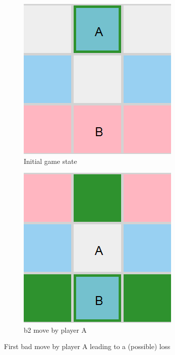 \begin{figure}[!ht]
    \begin{subfigure}{0.3\textwidth}
      \includegraphics[width=\textwidth]{../img/GameBoard/3_3_board_start.png}
      \caption{Initial game state}
      \label{fig:3x3InitialGameState}
    \end{subfigure}
    \hfill
    \begin{subfigure}{0.3\textwidth}
      \includegraphics[width=\textwidth]{../img/GameBoard/3_3_mcts_move.png}
      \caption{b2 move by player A}
        \label{fig:3x3b2movebyA}
    \end{subfigure}
    \caption{First bad move by player A leading to a (possible) loss}
\label{fig:3x3BadMove}
\end{figure}

